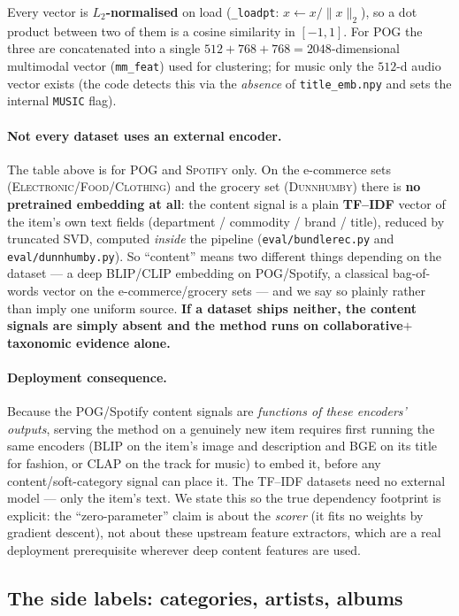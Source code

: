 \documentclass[11pt]{article}
\theoremstyle{remark}
\newcommand{\code}[1]{\texttt{\small #1}}
\begin{document}
\noindent Every vector is \textbf{$L_2$-normalised} on load (\code{\_loadpt}: $x\leftarrow x/\lVert x\rVert_2$), so a
dot product between two of them is a cosine similarity in $[-1,1]$. For \textsc{POG} the three are concatenated into
a single $512{+}768{+}768=2048$-dimensional multimodal vector (\code{mm\_feat}) used for clustering; for music only
the $512$-d audio vector exists (the code detects this via the \emph{absence} of \code{title\_emb.npy} and sets the
internal \code{MUSIC} flag).

\paragraph{Not every dataset uses an external encoder.} The table above is for \textsc{POG} and \textsc{Spotify}
only. On the e-commerce sets (\textsc{Electronic}/\textsc{Food}/\textsc{Clothing}) and the grocery set
(\textsc{Dunnhumby}) there is \textbf{no pretrained embedding at all}: the content signal is a plain \textbf{TF--IDF}
vector of the item's own text fields (department / commodity / brand / title), reduced by truncated SVD, computed
\emph{inside} the pipeline (\code{eval/bundlerec.py} and \code{eval/dunnhumby.py}). So ``content'' means two
different things depending on the dataset --- a deep BLIP/CLIP embedding on POG/Spotify, a classical bag-of-words
vector on the e-commerce/grocery sets --- and we say so plainly rather than imply one uniform source. \textbf{If a
dataset ships neither, the content signals are simply absent and the method runs on collaborative$+$taxonomic
evidence alone.}

\paragraph{Deployment consequence.} Because the POG/Spotify content signals are \emph{functions of these encoders'
outputs}, serving the method on a genuinely new item requires first running the same encoders (BLIP on the item's
image and description and BGE on its title for fashion, or CLAP on the track for music) to embed it, before any
content/soft-category signal can place it. The TF--IDF datasets need
no external model --- only the item's text. We state this so the true dependency footprint is explicit: the
``zero-parameter'' claim is about the \emph{scorer} (it fits no weights by gradient descent), not about these upstream
feature extractors, which are a real deployment prerequisite wherever deep content features are used.

\subsection{The side labels: categories, artists, albums}
\end{document}
